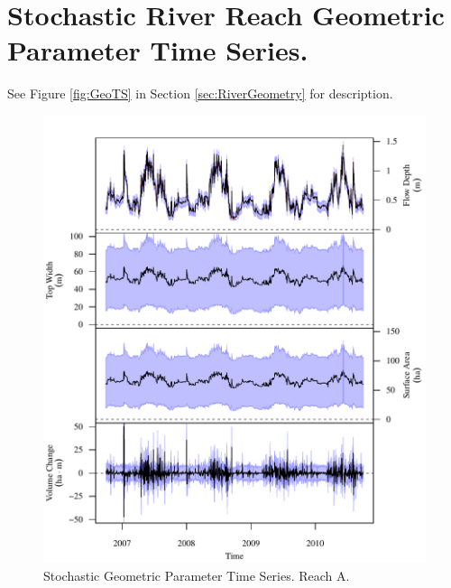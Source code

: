 \section{Stochastic River Reach Geometric Parameter Time Series.}
\label{App:GeoTS}

See Figure \ref{fig:GeoTS} in Section \ref{sec:RiverGeometry} for description.

\begin{figure}[htbp]
\begin{center}
	\includegraphics[width=5.5in]{"Figures/Results_USR/G TS A"}
	\caption{Stochastic Geometric Parameter Time Series.  Reach A.}
\end{center}
\end{figure}
\newpage

